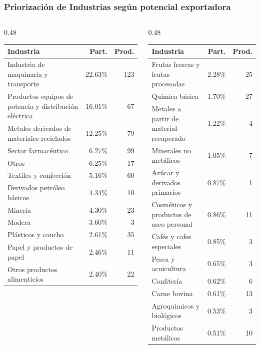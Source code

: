 \documentclass[aspectratio=169,xcolor=dvipsnames]{beamer}
\begin{document}
\begin{frame}
\frametitle{Priorización de Industrias según potencial exportadora}
\tiny
\renewcommand{\arraystretch}{1.2}
\begin{center}
\begin{columns}[T]
\begin{column}{0.48\textwidth}
\centering
\begin{tabular}{lrr}
\toprule
Industria & Part. & Prod. \\
\midrule
Industria de maquinaria y transporte & 22.63\% & 123 \\
Productos equipos de potencia y distribución eléctrica & 16.01\% & 67 \\
Metales derivados de materiales reciclados & 12.25\% & 79 \\
Sector farmacéutico & 6.27\% & 99 \\
Otros & 6.25\% & 17 \\
Textiles y confección & 5.16\% & 60 \\
Derivados petróleo básicos & 4.34\% & 10 \\
Minería & 4.30\% & 23 \\
Madera & 3.60\% & 3 \\
Plásticos y caucho & 2.61\% & 35 \\
Papel y productos de papel & 2.46\% & 11 \\
Otros productos alimenticios & 2.40\% & 22 \\
\bottomrule
\end{tabular}
\end{column}
\begin{column}{0.48\textwidth}
\centering
\begin{tabular}{lrr}
\toprule
Industria & Part. & Prod. \\
\midrule
Frutas frescas y frutas procesadas & 2.28\% & 25 \\
Química básica & 1.70\% & 27 \\
Metales a partir de material recuperado & 1.22\% & 4 \\
Minerales no metálicos & 1.05\% & 7 \\
Azúcar y derivados primarios & 0.87\% & 1 \\
Cosméticos y productos de aseo personal & 0.86\% & 11 \\
Cafés y cafes especiales & 0.85\% & 3 \\
Pesca y acuicultura & 0.65\% & 3 \\
Confitería & 0.62\% & 6 \\
Carne bovina & 0.61\% & 13 \\
Agroquímicos y biológicos & 0.53\% & 3 \\
Productos metálicos & 0.51\% & 10 \\
\bottomrule
\end{tabular}
\end{column}
\end{columns}
\end{center}
\end{frame}
\end{document}
